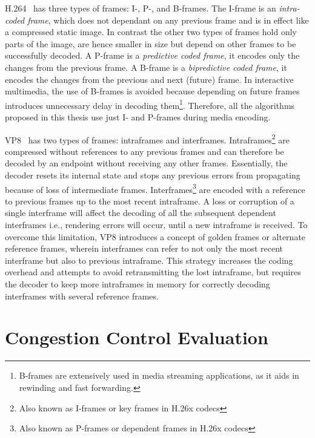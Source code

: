 H.264~\cite{h264} has three types of frames: I-, P-, and B-frames. The I-frame
is an \emph{intra-coded frame}, which does not dependant on any previous frame
and is in effect like a compressed static image. In contrast the other two types
of frames hold only parts of the image, are hence smaller in size but depend on
other frames to be successfully decoded. A P-frame is a \emph{predictive coded
frame}, it encodes only the changes from the previous frame. A B-frame is a
\emph{bipredictive coded frame}, it encodes the changes from the previous and
next (future) frame. In interactive multimedia, the use of B-frames is
avoided because depending on future frames introduces unnecessary delay in
decoding them\footnote{B-frames are extensively used in media streaming
applications, as it aids in rewinding and fast forwarding.}.
Therefore, all the algorithms proposed in this thesis use just I- and P-frames
during media encoding.


VP8~\cite{rfc6386} has two types of frames: intraframes and interframes.
Intraframes\footnote{Also known as I-frames or key frames in H.26x codecs} are
compressed without references to any previous frames and can therefore be
decoded by an endpoint without receiving any other frames. Essentially, the
decoder resets its internal state and stops any previous errors from
propagating because of loss of intermediate frames. Interframes\footnote{Also
known as P-frames or dependent frames in H.26x codecs} are encoded with a
reference to previous frames up to the most recent intraframe. A loss or
corruption of a single interframe will affect the decoding of all the
subsequent dependent interframes i.e., rendering errors will occur, until a
new intraframe is received. To overcome this limitation, VP8 introduces a
concept of golden frames or alternate reference frames, wherein interframes
can refer to not only the most recent interframe but also to previous
intraframe. This strategy increases the coding overhead and attempts to avoid
retransmitting the lost intraframe, but requires the decoder to keep more
intraframes in memory for correctly decoding interframes with several
reference frames.


\section{Congestion Control Evaluation}
\label{fw.cc.eval}


